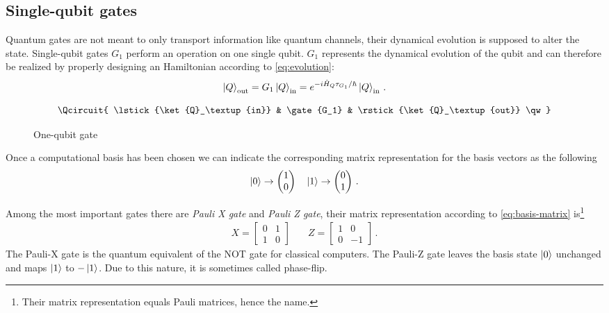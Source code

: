 \subsection{Single-qubit gates}
Quantum gates are not meant to only transport information like quantum channels, their dynamical evolution is supposed to alter the state.
Single-qubit gates $G_1$ perform an operation on one single qubit. $G_1$ represents the dynamical evolution of the qubit and can therefore be realized by properly designing an Hamiltonian according to \eqref{eq:evolution}:
\begin{equation*}
   \ket{Q}_\textup{out} = G_1\ket{Q}_\textup{in} = e^{-i\hat{H}_Q \tau_{G_1}/\hbar}\ket{Q}_\textup{in}\,.
\end{equation*}

\begin{figure}[htb]
\[ \Qcircuit {
     \lstick{\ket{Q}_\textup{in}}  & \gate{G_1} & \rstick{\ket{Q}_\textup{out}} \qw 
}\]
\caption{One-qubit gate}
\label{fig:one-qubit-gate}
\end{figure}


Once a computational basis has been chosen we can indicate the corresponding matrix representation for the basis vectors as the following
\begin{equation}\label{eq:basis-matrix}
    \ket{0} \rightarrow \begin{pmatrix} 1 \\ 0 \end{pmatrix} \quad \ket{1} \rightarrow \begin{pmatrix} 0 \\ 1 \end{pmatrix}\,.
\end{equation}

Among the most important gates there are \emph{Pauli X gate} and \emph{Pauli Z gate}, their matrix representation according to \ref{eq:basis-matrix} is\footnote{Their matrix representation equals Pauli matrices, hence the name.}
\begin{align*}
    X = 
    \begin{bmatrix}
    0 & 1\\
    1 & 0
    \end{bmatrix} 
    \quad &
     Z = 
    \begin{bmatrix}
    1 & 0\\
    0 & -1
    \end{bmatrix}\,.
\end{align*}
The Pauli-X gate is the quantum equivalent of the NOT gate for classical computers. 
The Pauli-Z gate leaves the basis state $\ket{0}$  unchanged and maps $\ket{1}$  to $-\ket{1}$. Due to this nature, it is sometimes called phase-flip. 
